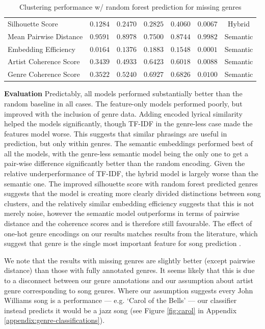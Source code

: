 \documentclass{article}
\newcommand{\minisection}[1]{\textbf{#1}\quad}
\begin{document}
\begin{table}[h!]
\begin{tabular}{l|cccccc}
\hline
Silhouette Score               & $0.1284$ & $0.2470$ & $0.2825$ & $\mathbf{0.4060}$ & $0.0067$ & Hybrid \\
Mean Pairwise Distance         & $0.9591$ & $0.8978$ & $\mathbf{0.7500}$ & $0.8744$ & $0.9982$ & Semantic \\
Embedding Efficiency           & $0.0164$ & $0.1376$ & $\mathbf{0.1883}$ & $0.1548$ & $0.0001$ & Semantic \\
Artist Coherence Score         & $0.3439$ & $0.4933$ & $\mathbf{0.6423}$ & $0.6018$ & $0.0088$ & Semantic \\
Genre Coherence Score          & $0.3522$ & $0.5240$ & $\mathbf{0.6927}$ & $0.6826$ & $0.0100$ & Semantic \\
\end{tabular}
\vspace{0.25em}
\caption{Clustering performance w/ random forest prediction for missing genres}
\label{tab:prediction-clustering-random-forest}
\end{table}

\minisection{Evaluation} Predictably, all models performed substantially better than the random baseline in all cases. The feature-only models performed poorly, but improved with the inclusion of genre data. Adding encoded lyrical similarity helped the models significantly, though TF-IDF in the genre-less case made the features model worse. This suggests that similar phrasings are useful in prediction, but only within genres. The semantic embeddings performed best of all the models, with the genre-less semantic model being the only one to get a pair-wise difference significantly better than the random encoding. Given the relative underperformance of TF-IDF, the hybrid model is largely worse than the semantic one. The improved silhouette score with random forest predicted genres suggests that the model is creating more clearly divided distinctions between song clusters, and the relatively similar embedding efficiency suggests that this is not merely noise, however the semantic model outperforms in terms of pairwise distance and the coherence scores and is therefore still favourable. The effect of one-hot genre encodings on our results matches results from the literature, which suggest that genre is the single most important feature for song prediction \citep{abhilash2020identifying}.

We note that the results with missing genres are slightly better (except pairwise distance) than those with fully annotated genres. It seems likely that this is due to a disconnect between our genre annotations and our assumption about artist genre corresponding to song genres. Where our assumption suggests every John Williams song is a performance --- e.g. `Carol of the Bells' --- our classifier instead predicts it would be a jazz song (see Figure \ref{fig:carol} in Appendix \ref{appendix:genre-classifications}).
\end{document}
